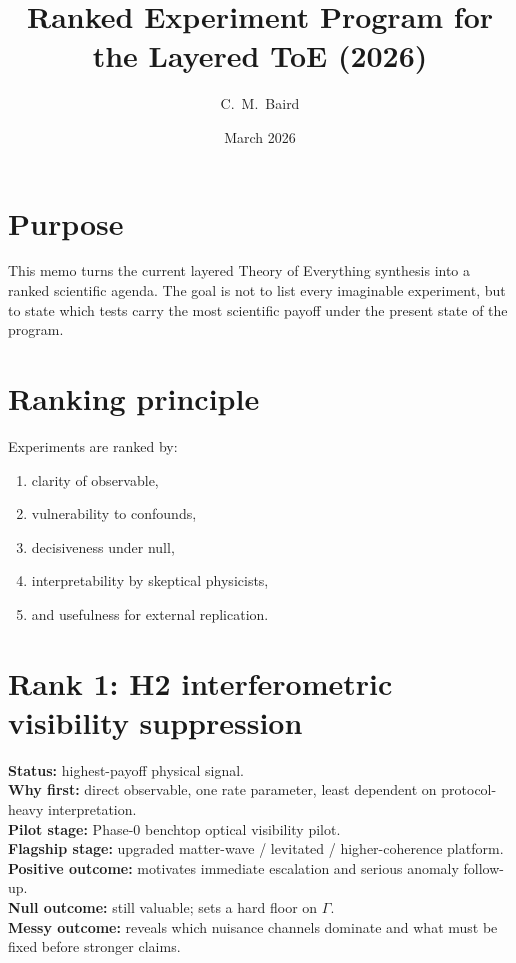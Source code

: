 \documentclass[reprint,amsmath,amssymb,aps,showkeys]{revtex4-2}
\title{Ranked Experiment Program for the Layered ToE (2026)}
\author{C.~M.~Baird}
\affiliation{Baird--ZoraASI Collaboration}
\date{March 2026}
\begin{document}
\maketitle

\section*{Purpose}
This memo turns the current layered Theory of Everything synthesis into a ranked scientific agenda. The goal is not to list every imaginable experiment, but to state which tests carry the most scientific payoff under the present state of the program.

\section*{Ranking principle}
Experiments are ranked by:
\begin{enumerate}
    \item clarity of observable,
    \item vulnerability to confounds,
    \item decisiveness under null,
    \item interpretability by skeptical physicists,
    \item and usefulness for external replication.
\end{enumerate}

\section*{Rank 1: H2 interferometric visibility suppression}
\textbf{Status:} highest-payoff physical signal.\\
\textbf{Why first:} direct observable, one rate parameter, least dependent on protocol-heavy interpretation.\\
\textbf{Pilot stage:} Phase-0 benchtop optical visibility pilot.\\
\textbf{Flagship stage:} upgraded matter-wave / levitated / higher-coherence platform.\\
\textbf{Positive outcome:} motivates immediate escalation and serious anomaly follow-up.\\
\textbf{Null outcome:} still valuable; sets a hard floor on $\Gamma$.\\
\textbf{Messy outcome:} reveals which nuisance channels dominate and what must be fixed before stronger claims.
\end{document}
